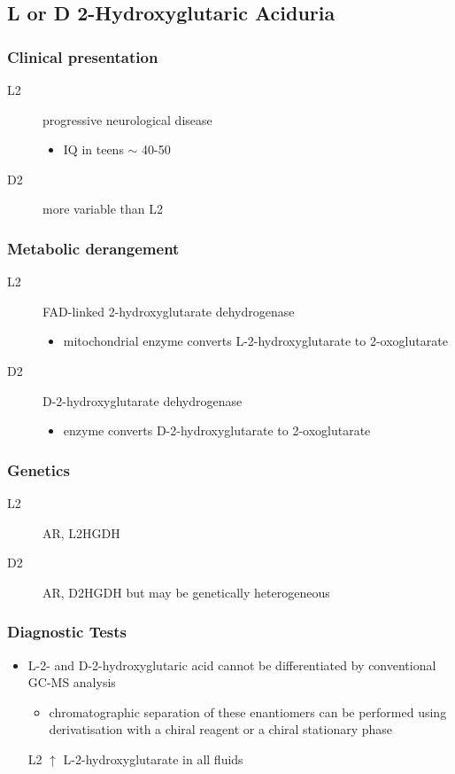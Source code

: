 \documentclass{scrartcl}
\begin{document}
\subsection{L or D 2-Hydroxyglutaric Aciduria}
\label{sec:org551105a}
\subsubsection{Clinical presentation}
\label{sec:orga091297}
\begin{description}
\item[{L2}] progressive neurological disease
\begin{itemize}
\item IQ in teens \(\sim\) 40-50
\end{itemize}
\item[{D2}] more variable than L2
\end{description}

\subsubsection{Metabolic derangement}
\label{sec:orgdf2ba90}
\begin{description}
\item[{L2}] FAD-linked 2-hydroxyglutarate dehydrogenase
\begin{itemize}
\item mitochondrial enzyme converts L-2-hydroxyglutarate to
2-oxoglutarate
\end{itemize}
\item[{D2}] D-2-hydroxyglutarate dehydrogenase
\begin{itemize}
\item enzyme converts D-2-hydroxyglutarate to 2-oxoglutarate
\end{itemize}
\end{description}

\subsubsection{Genetics}
\label{sec:org188b192}
\begin{description}
\item[{L2}] AR, L2HGDH
\item[{D2}] AR, D2HGDH but may be genetically heterogeneous
\end{description}

\subsubsection{Diagnostic Tests}
\label{sec:org3728c3f}
\begin{itemize}
\item L-2- and D-2-hydroxyglutaric acid cannot be differentiated by
conventional GC-MS analysis
\begin{itemize}
\item chromatographic separation of these enantiomers can be performed
using derivatisation with a chiral reagent or a chiral stationary
phase
\end{itemize}
\item[{L2}] \(\uparrow\) L-2-hydroxyglutarate in all fluids
\end{itemize}
\end{document}
